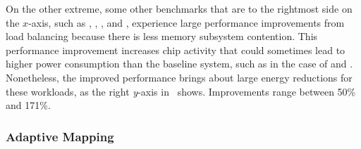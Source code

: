 On the other extreme, some other benchmarks that are to the rightmost side on the $x$-axis, such as , , ,  and , experience large performance improvements from load balancing because there is less memory subsystem contention. This performance improvement increases chip activity that could sometimes lead to higher power consumption than the baseline system, such as in the case of  and . Nonetheless, the improved performance brings about large energy reductions for these workloads, as the right \textit{y}-axis in~ shows. Improvements range between 50\% and 171\%.

\subsubsection{Adaptive Mapping}
\label{sec:ams:ams:adaptive-mapping}

